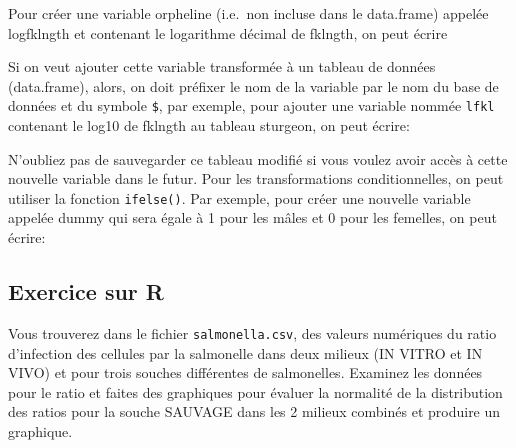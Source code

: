 \documentclass[
  12pt,
]{book}
\newenvironment{Shaded}{\begin{snugshade}}{\end{snugshade}}
\newcommand{\DecValTok}[1]{\textcolor[rgb]{0.00,0.00,0.81}{#1}}
\newcommand{\KeywordTok}[1]{\textcolor[rgb]{0.13,0.29,0.53}{\textbf{#1}}}
\newcommand{\NormalTok}[1]{#1}
\newcommand{\OperatorTok}[1]{\textcolor[rgb]{0.81,0.36,0.00}{\textbf{#1}}}
\newcommand{\StringTok}[1]{\textcolor[rgb]{0.31,0.60,0.02}{#1}}
\begin{document}
Pour créer une variable orpheline (i.e.~non incluse dans le data.frame) appelée logfklngth et contenant le logarithme décimal de fklngth, on peut écrire

\begin{Shaded}
\end{Shaded}

Si on veut ajouter cette variable transformée à un tableau de données (data.frame), alors, on doit préfixer le nom de la variable par le nom du base de données et du symbole \texttt{\$}, par exemple, pour ajouter une variable nommée \texttt{lfkl} contenant le log10 de fklngth au tableau sturgeon, on peut écrire:

\begin{Shaded}
\end{Shaded}

N'oubliez pas de sauvegarder ce tableau modifié si vous voulez avoir accès à cette nouvelle variable dans le futur.
Pour les transformations conditionnelles, on peut utiliser la fonction \texttt{ifelse()}.
Par exemple, pour créer une nouvelle variable appelée dummy qui sera égale à 1 pour les mâles et 0 pour les femelles, on peut écrire:

\begin{Shaded}
\end{Shaded}

\hypertarget{exercice-sur-r}{%
\subsection{Exercice sur R}\label{exercice-sur-r}}

Vous trouverez dans le fichier \texttt{salmonella.csv}, des valeurs numériques du ratio d'infection des cellules par la salmonelle dans deux milieux (IN VITRO et IN VIVO) et pour trois souches différentes de salmonelles.
Examinez les données pour le ratio et faites des graphiques pour évaluer la normalité de la distribution des ratios pour la souche SAUVAGE dans les 2 milieux combinés et produire un graphique.
\end{document}
